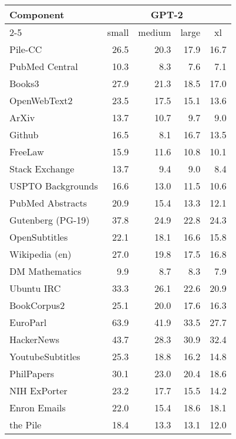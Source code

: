\documentclass[11pt,a4paper]{article}
\begin{document}
\begin{appendices}
\begin{table*}[ht]
    \centering
    \begin{tabular}{l rrrr}
    \toprule
        \textbf{Component} 
        & \multicolumn{4}{c}{GPT-2}
        \\ \cmidrule(lr){2-5}
        & \multicolumn{1}{c}{small}
        & \multicolumn{1}{c}{medium}
        & \multicolumn{1}{c}{large}
        & \multicolumn{1}{c}{xl}
        \\
        \midrule
    Pile-CC & 26.5 & 20.3 & 17.9 & 16.7  \\
    PubMed Central & 10.3 & 8.3 & 7.6 & 7.1  \\
    Books3 & 27.9 & 21.3 & 18.5 & 17.0  \\
    OpenWebText2 & 23.5 & 17.5 & 15.1 & 13.6  \\
    ArXiv & 13.7 & 10.7 & 9.7 & 9.0  \\
    Github & 16.5 & 8.1 & 16.7 & 13.5  \\
    FreeLaw & 15.9 & 11.6 & 10.8 & 10.1  \\
    Stack Exchange & 13.7 & 9.4 & 9.0 & 8.4  \\
    USPTO Backgrounds & 16.6 & 13.0 & 11.5 & 10.6  \\
    PubMed Abstracts & 20.9 & 15.4 & 13.3 & 12.1  \\
    Gutenberg (PG-19) & 37.8 & 24.9 & 22.8 & 24.3  \\
    OpenSubtitles & 22.1 & 18.1 & 16.6 & 15.8  \\
    Wikipedia (en) & 27.0 & 19.8 & 17.5 & 16.8  \\
    DM Mathematics & 9.9 & 8.7 & 8.3 & 7.9  \\
    Ubuntu IRC & 33.3 & 26.1 & 22.6 & 20.9  \\
    BookCorpus2 & 25.1 & 20.0 & 17.6 & 16.3  \\
    EuroParl & 63.9 & 41.9 & 33.5 & 27.7  \\
    HackerNews & 43.7 & 28.3 & 30.9 & 32.4  \\
    YoutubeSubtitles & 25.3 & 18.8 & 16.2 & 14.8  \\
    PhilPapers & 30.1 & 23.0 & 20.4 & 18.6  \\
    NIH ExPorter & 23.2 & 17.7 & 15.5 & 14.2  \\
    Enron Emails & 22.0 & 15.4 & 18.6 & 18.1  \\
    \midrule
    the Pile & 18.4 & 13.3 & 13.1 & 12.0 \\
        \bottomrule
    \end{tabular}
\caption{Full Test Perplexity of the Pile using GPT-2.}
\label{table:pile_perplexity_fullgpt2}
\end{table*}


\end{appendices}
\end{document}

